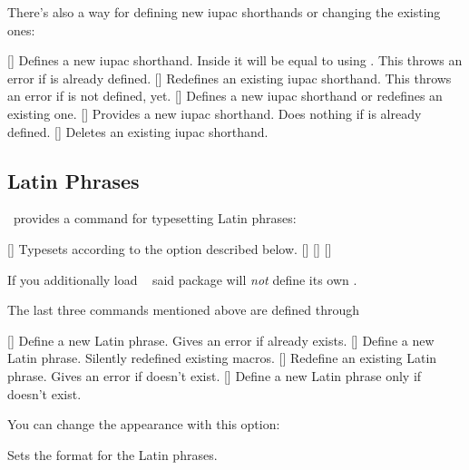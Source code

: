 \documentclass{chemmacros-manual}
\begin{document}
There's also a way for defining new \ac{iupac} shorthands or changing the
existing ones:
\begin{commands}
  []
    Defines a new \ac{iupac} shorthand.  Inside  it will be equal to
    using .  This throws an error if  is already defined.
  []
    Redefines an existing \ac{iupac} shorthand.  This throws an error if
     is not defined, yet.
  []
    Defines a new \ac{iupac} shorthand or redefines an existing one.
  []
    Provides a new \ac{iupac} shorthand.  Does nothing if  is already defined.
  []
    Deletes an existing \ac{iupac} shorthand.
\end{commands}

\subsection{Latin Phrases}

\chemmacros\ provides a command for typesetting Latin phrases:
\begin{commands}
  []
    Typesets  according to the option  described
    below.
  [\quad\insitu]
  [\quad\invacuo]
  [\quad\abinitio]
\end{commands}

If you additionally load ~\cite{pkg:chemstyle} said package
will \emph{not} define its own .

The last three commands mentioned above are defined through
\begin{commands}
  []
    Define a new Latin phrase.  Gives an error if  already exists.
  []
    Define a new Latin phrase.  Silently redefined existing macros.
  []
    Redefine an existing Latin phrase.  Gives an error if  doesn't
    exist.
  []
    Define a new Latin phrase only if  doesn't exist.
\end{commands}
\begin{example}
  \NewChemLatin{}\ltn
\end{example}
You can change the appearance with this option:
\begin{options}
    Sets the format for the Latin phrases.
\end{options}
\end{document}

